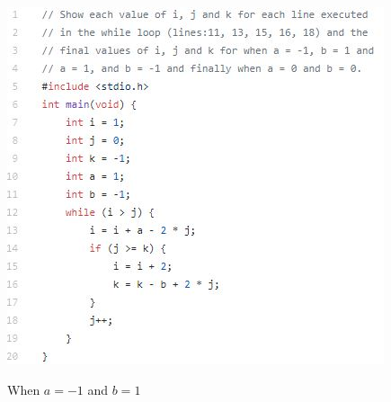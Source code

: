 \documentclass[12pt]{article}
\begin{document}
\noindent\centerline{\includegraphics{debug.jpg}}
\newpage
When $a = -1$ and $b = 1$
\end{document}
